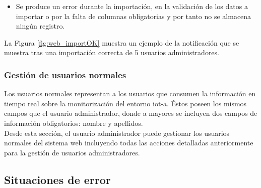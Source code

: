 \documentclass[12pt,a4paper, twoside]{report}
\begin{document}
\begin{itemize}
\begin{itemize}
				\item Se produce un error durante la importación, en la validación de los datos a importar o por la falta de columnas obligatorias y por tanto no se almacena ningún registro.
			\end{itemize}
		
			
			La Figura \ref{fig:web_importOK} muestra un ejemplo de la notificación que se muestra tras una importación correcta de 5 usuarios administradores.
			
			
	\end{itemize}
								
	\subsubsection{Gestión de usuarios normales}
	
	Los usuarios normales representan a los usuarios que consumen la información en tiempo real sobre la monitorización del entorno \gls{iot-a}. Éstos poseen los mismos campos que el usuario administrador, donde a mayores se incluyen dos campos de información obligatorios: nombre y apellidos. \\
	
	Desde esta sección, el usuario administrador puede gestionar los usuarios normales del sistema web incluyendo todas las acciones detalladas anteriormente para la gestión de usuarios administradores.
			
	\subsection{Situaciones de error}
	
\end{document}
